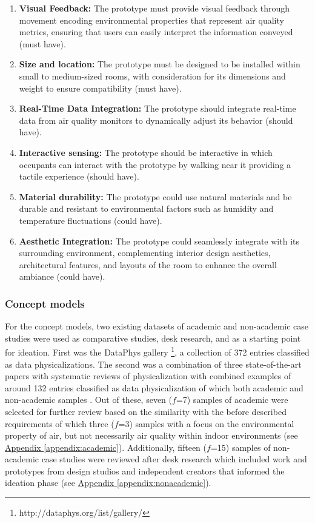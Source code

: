 \begin{enumerate}
    \renewcommand{\labelenumi}{R\arabic{enumi}:}
    \item \textbf{Visual Feedback:} The prototype must provide visual feedback through movement encoding environmental properties that represent air quality metrics, ensuring that users can easily interpret the information conveyed (must have).
    \item \textbf{Size and location:} The prototype must be designed to be installed within small to medium-sized rooms, with consideration for its dimensions and weight to ensure compatibility (must have).
    \item \textbf{Real-Time Data Integration:} The prototype should integrate real-time data from air quality monitors to dynamically adjust its behavior (should have).
    \item \textbf{Interactive sensing:} The prototype should be interactive in which occupants can interact with the prototype by walking near it providing a tactile experience (should have).
    \item \textbf{Material durability:} The prototype could use natural materials and be durable and resistant to environmental factors such as humidity and temperature fluctuations (could have).
    \item \textbf{Aesthetic Integration:} The prototype could seamlessly integrate with its surrounding environment, complementing interior design aesthetics, architectural features, and layouts of the room to enhance the overall ambiance (could have).
\end{enumerate}

\subsubsection{Concept models}

For the concept models, two existing datasets of academic and non-academic case studies were used as comparative studies, desk research, and as a starting point for ideation. First was the DataPhys gallery \footnote{http://dataphys.org/list/gallery/}, a collection of 372 entries classified as data physicalizations. The second was a combination of three state-of-the-art papers with systematic reviews of physicalization with combined examples of around 132 entries classified as data physicalization of which both academic and non-academic samples \cite{sauve_physecology_2022, anhalt_university_germany_design_2022, ranasinghe_encoding_2023}. Out of these, seven ($f$=7) samples of academic were selected for further review based on the similarity with the before described requirements of which three ($f$=3) samples with a focus on the environmental property of air, but not necessarily air quality within indoor environments (see \hyperref[appendix:academic]{Appendix \ref*{appendix:academic}}). Additionally, fifteen ($f$=15) samples of non-academic case studies were reviewed after desk research which included work and prototypes from design studios and independent creators that informed the ideation phase (see \hyperref[appendix:nonacademic]{Appendix \ref*{appendix:nonacademic}}).

